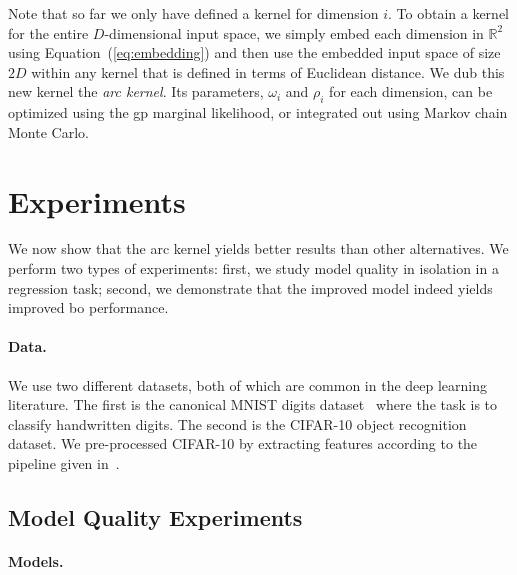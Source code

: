 \documentclass{article}
\newcommand{\bo}{{\sc bo}}
\newcommand{\gp}{{\sc gp}}
\begin{document}
Note that so far we only have defined a kernel for dimension $i$. To obtain a kernel for the entire $D$-dimensional input space, we simply embed each dimension in $\mathbb{R}^2$ using Equation~(\ref{eq:embedding}) and then use the embedded input space of size $2D$ within any kernel that is defined in terms of Euclidean distance.
We dub this new kernel the \emph{arc kernel}. Its parameters, $\omega_i$ and $\rho_i$ for each dimension, can be optimized using the \gp{} marginal likelihood, or integrated out using Markov chain Monte Carlo.


\section{Experiments}
\vspace{-0.05in} 

We now show that the arc kernel yields better results than other alternatives. 
We perform two types of experiments: first, we study model quality in isolation in a regression task; second, we demonstrate that the improved model indeed yields improved \bo{} performance.

\paragraph{Data.} We use two different datasets, both of which are common in the deep learning literature. The first is the canonical MNIST digits dataset~\cite{lecun-1998a} where the task is to classify handwritten digits. The second is the CIFAR-10 object recognition dataset. We pre-processed CIFAR-10 by extracting features according to the pipeline given in~\cite{coates2010analysis}.

\subsection{Model Quality Experiments}   

\paragraph{Models.}
\end{document}
